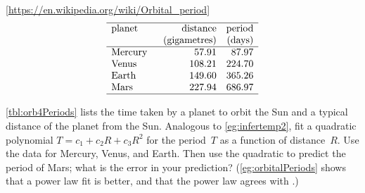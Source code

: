 \begin{exercise} \label{ex:orb4Periods} 
\begin{table}
\caption{Orbital periods for four  of the : the periods are in (Earth) days; the distance is the length of the semi-major axis of the orbits (, 2014).}
\label{tbl:orb4Periods}
{\footnotesize[\protect\url{https://en.wikipedia.org/wiki/Orbital\_period}]}
\begin{equation*}
\begin{array}{p{10ex}rr} \hline
planet&\text{distance}&\text{period}\\
&\text{(gigametres)}&\text{(days)}\\\hline
Mercury& 57.91 & 87.97 \\
Venus& 108.21 & 224.70 \\
Earth& 149.60& 365.26\\
Mars& 227.94& 686.97\\\hline
\end{array}
\end{equation*}
\end{table}%
\cref{tbl:orb4Periods} lists the time taken by a planet to orbit the Sun and a typical distance of the planet from the Sun. 
Analogous to \cref{eg:infertemp2}, fit a quadratic polynomial \(T=c_1+c_2R+c_3R^2\) for the period~\(T\) as a function of distance~\(R\).
Use the data for Mercury, Venus, and Earth.
Then use the quadratic to predict the period of Mars; what is the error in your prediction?
(\cref{eg:orbitalPeriods} shows that a power law fit is better, and that the power law agrees with .)
\end{exercise}







